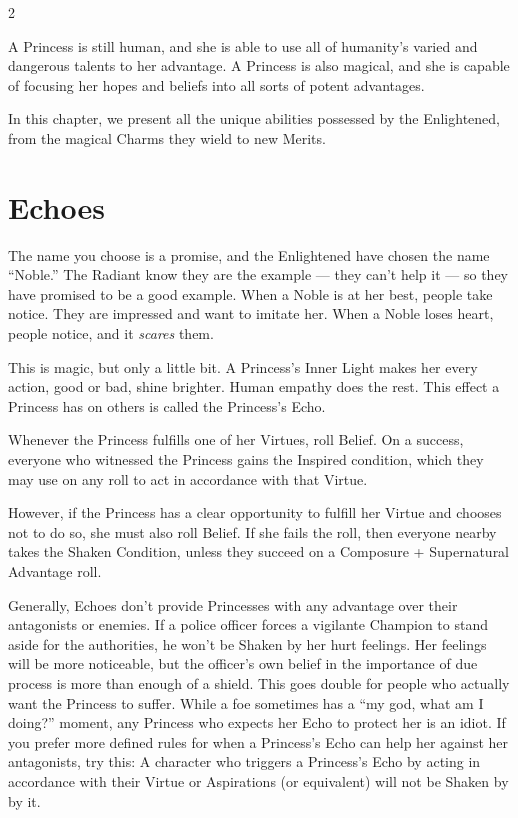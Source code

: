 \label{cha:PowerOfLove}

\begin{multicols}{2}\raggedcolumns

\noindent A Princess is still human, and she is able to use all of humanity's varied and dangerous talents to her advantage. A Princess is also magical, and she is capable of focusing her hopes and beliefs into all sorts of potent advantages. 

In this chapter, we present all the unique abilities possessed by the Enlightened, from the magical Charms they wield to new Merits.


\section*{Echoes}
\label{sec:Echoes}

The name you choose is a promise, and the Enlightened have chosen the name “Noble.” The Radiant know they are the example — they can't help it — so they have promised to be a good example. When a Noble is at her best, people take notice. They are impressed and want to imitate her. When a Noble loses heart, people notice, and it \textit{scares} them.  

This is magic, but only a little bit. A Princess's Inner Light makes her every action, good or bad, shine brighter. Human empathy does the rest. This effect a Princess has on others is called the Princess's Echo. 

Whenever the Princess fulfills one of her Virtues, roll Belief. On a success, everyone who witnessed the Princess gains the Inspired condition, which they may use on any roll to act in accordance with that Virtue. 

However, if the Princess has a clear opportunity to fulfill her Virtue and chooses not to do so, she must also roll Belief. If she fails the roll, then everyone nearby takes the Shaken Condition, unless they succeed on a Composure + Supernatural Advantage roll. 

Generally, Echoes don't provide Princesses with any advantage over their antagonists or enemies. If a police officer forces a vigilante Champion to stand aside for the authorities, he won't be Shaken by her hurt feelings. Her feelings will be more noticeable, but the officer's own belief in the importance of due process is more than enough of a shield. This goes double for people who actually want the Princess to suffer. While a foe sometimes has a “my god, what am I doing?” moment, any Princess who expects her Echo to protect her is an idiot. If you prefer more defined rules for when a Princess's Echo can help her against her antagonists, try this: A character who triggers a Princess's Echo by acting in accordance with their Virtue or Aspirations (or equivalent) will not be Shaken by by it. 


\end{multicols}
